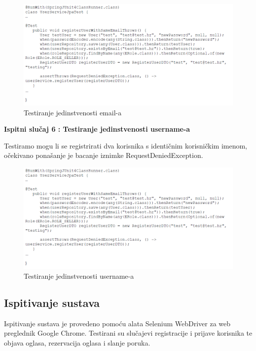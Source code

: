 	\begin{figure}[H]
		\includegraphics[scale=0.7]{slike/test5.PNG} %
		\centering
		\caption{Testiranje jedinstvenosti email-a}
		\label{fig:test5}
	\end{figure}
			
			
				\textbf{Ispitni slučaj 6 : Testiranje jedinstvenosti username-a}
			
		Testiramo mogu li se registrirati dva korisnika s identičnim korisničkim imenom, očekivano ponašanje je bacanje iznimke RequestDeniedException. 
			
			\begin{figure}[H]
				\includegraphics[scale=0.7]{slike/test5.PNG} %
				\centering
				\caption{Testiranje jedinstvenosti username-a}
				\label{fig:test6}
			\end{figure} 
		
			\subsection{Ispitivanje sustava}
			
			
			Ispitivanje sustava je provedeno pomoću alata Selenium WebDriver za web preglednik Google Chrome. Testirani su slučajevi registracije i prijave korisnika te objava oglasa, rezervacija oglasa i slanje poruka.
			
